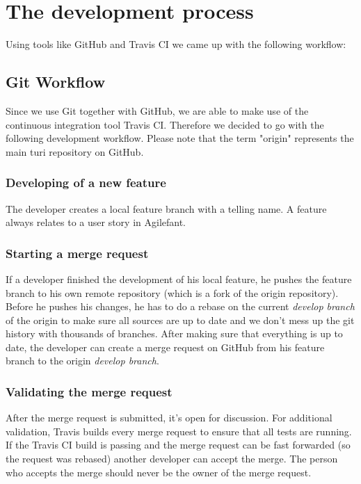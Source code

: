 \documentclass[a4paper]{article}
\begin{document}
\section{The development process}

Using tools like GitHub and Travis CI we came up with the following workflow:

\subsection{Git Workflow}
Since we use Git together with GitHub, we are able to make use of the continuous integration tool Travis CI. Therefore we decided to go with the following development workflow. Please note that the term "origin" represents the main turi repository on GitHub.

\subsubsection{Developing of a new feature}
The developer creates a local feature branch with a telling name. A feature always relates to a user story in Agilefant.

\subsubsection{Starting a merge request}
If a developer finished the development of his local feature, he pushes the feature branch to his own remote repository (which is a fork of the origin repository). Before he pushes his changes, he has to do a rebase on the current \textit{develop branch} of the origin to make sure all sources are up to date and we don't mess up the git history with thousands of branches. After making sure that everything is up to date, the developer can create a merge request on GitHub from his feature branch to the origin \textit{develop branch}.

\subsubsection{Validating the merge request}
After the merge request is submitted, it's open for discussion. For additional validation, Travis builds every merge request to ensure that all tests are running. If the Travis CI build is passing and the merge request can be fast forwarded (so the request was rebased) another developer can accept the merge. The person who accepts the merge should never be the owner of the merge request.
\end{document}
